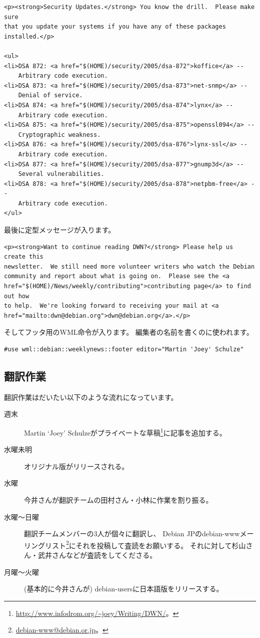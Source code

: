 \documentclass[mingoth,a4paper]{jsarticle}
\begin{document}
\begin{verbatim}
<p><strong>Security Updates.</strong> You know the drill.  Please make sure
that you update your systems if you have any of these packages installed.</p>

<ul>
<li>DSA 872: <a href="$(HOME)/security/2005/dsa-872">koffice</a> --
    Arbitrary code execution.
<li>DSA 873: <a href="$(HOME)/security/2005/dsa-873">net-snmp</a> --
    Denial of service.
<li>DSA 874: <a href="$(HOME)/security/2005/dsa-874">lynx</a> --
    Arbitrary code execution.
<li>DSA 875: <a href="$(HOME)/security/2005/dsa-875">openssl094</a> --
    Cryptographic weakness.
<li>DSA 876: <a href="$(HOME)/security/2005/dsa-876">lynx-ssl</a> --
    Arbitrary code execution.
<li>DSA 877: <a href="$(HOME)/security/2005/dsa-877">gnump3d</a> --
    Several vulnerabilities.
<li>DSA 878: <a href="$(HOME)/security/2005/dsa-878">netpbm-free</a> --
    Arbitrary code execution.
</ul>
\end{verbatim}

最後に定型メッセージが入ります。

\begin{verbatim}
<p><strong>Want to continue reading DWN?</strong> Please help us create this
newsletter.  We still need more volunteer writers who watch the Debian
community and report about what is going on.  Please see the <a
href="$(HOME)/News/weekly/contributing">contributing page</a> to find out how
to help.  We're looking forward to receiving your mail at <a
href="mailto:dwn@debian.org">dwn@debian.org</a>.</p>
\end{verbatim}

そしてフッタ用のWML命令が入ります。
編集者の名前を書くのに使われます。

\begin{verbatim}
#use wml::debian::weeklynews::footer editor="Martin 'Joey' Schulze"
\end{verbatim}

\subsection{翻訳作業}

翻訳作業はだいたい以下のような流れになっています。

\begin{description}
 \item[週末] Martin `Joey' Schulzeがプライベートな草稿\footnote{\url{http://www.infodrom.org/~joey/Writing/DWN/}。}に記事を追加する。
 \item[水曜未明] オリジナル版がリリースされる。
 \item[水曜] 今井さんが翻訳チームの田村さん・小林に作業を割り振る。
 \item[水曜〜日曜] 翻訳チームメンバーの3人が個々に翻訳し、
   Debian JPのdebian-wwwメーリングリスト\footnote{\url{debian-www@debian.or.jp}。}にそれを投稿して査読をお願いする。
   それに対して杉山さん・武井さんなどが査読をしてくださる。
 \item[月曜〜火曜] (基本的に今井さんが) debian-usersに日本語版をリリースする。
\end{description}
\end{document}
